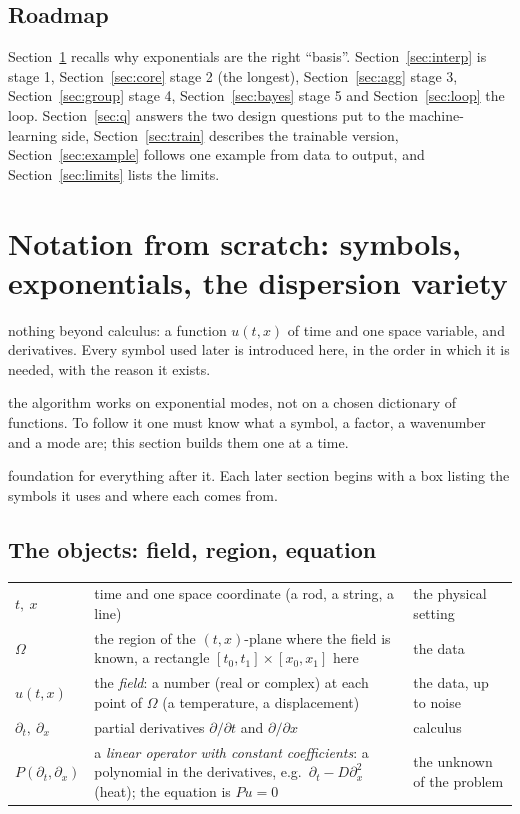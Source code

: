 \documentclass[11pt,a4paper]{article}
\theoremstyle{definition}
\newcommand{\sectionbrief}[3]{\begin{leadin}\begin{description}[nosep,leftmargin=3.0cm,labelwidth=2.8cm]
  \item[Starting from] #1
  \item[Why this section] #2
  \item[Role in the paper] #3
  \end{description}\end{leadin}}
\begin{document}
\subsection{Roadmap}
Section~\ref{sec:prelim} recalls why exponentials are the right ``basis''. Section~\ref{sec:interp} is stage 1, Section~\ref{sec:core} stage 2 (the longest), Section~\ref{sec:agg} stage 3, Section~\ref{sec:group} stage 4, Section~\ref{sec:bayes} stage 5 and Section~\ref{sec:loop} the loop. Section~\ref{sec:q} answers the two design questions put to the machine-learning side, Section~\ref{sec:train} describes the trainable version, Section~\ref{sec:example} follows one example from data to output, and Section~\ref{sec:limits} lists the limits.



\section{Notation from scratch: symbols, exponentials, the dispersion variety}\label{sec:prelim}
\sectionbrief
{nothing beyond calculus: a function $u(t,x)$ of time and one space variable, and derivatives. Every symbol used later is introduced here, in the order in which it is needed, with the reason it exists.}
{the algorithm works on exponential modes, not on a chosen dictionary of functions. To follow it one must know what a symbol, a factor, a wavenumber and a mode are; this section builds them one at a time.}
{foundation for everything after it. Each later section begins with a box listing the symbols it uses and where each comes from.}

\subsection{The objects: field, region, equation}
\begin{symbols}
\begin{tabular}{@{}L{2.3cm}L{6.2cm}L{4.5cm}@{}}
$t,\ x$ & time and one space coordinate (a rod, a string, a line) & the physical setting\\
$\Omega$ & the region of the $(t,x)$-plane where the field is known, a rectangle $[t_0,t_1]\times[x_0,x_1]$ here & the data\\
$u(t,x)$ & the \emph{field}: a number (real or complex) at each point of $\Omega$ (a temperature, a displacement) & the data, up to noise\\
$\partial_t,\ \partial_x$ & partial derivatives $\partial/\partial t$ and $\partial/\partial x$ & calculus\\
$P(\partial_t,\partial_x)$ & a \emph{linear operator with constant coefficients}: a polynomial in the derivatives, e.g.\ $\partial_t-D\partial_x^2$ (heat); the equation is $Pu=0$ & the unknown of the problem\\
\end{tabular}
\end{symbols}
\end{document}

